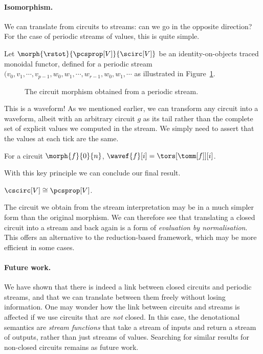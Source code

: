 \documentclass[11pt,numbib]{article}
\begin{document}
\paragraph*{Isomorphism.}

We can translate from circuits to streams: can we go in the opposite direction?
For the case of periodic streams of values, this is quite simple.

\begin{definition}
    Let $\morph{\rstot}{\pcsprop[V]}{\scirc[V]}$ be an identity-on-objects traced monoidal functor, defined for a periodic stream $(v_0,v_1,\cdots,v_{p-1},w_0,w_1,\cdots,w_{r-1},w_0,w_1,\cdots$ as illustrated in Figure~\ref{fig:streamcirc}.
\end{definition}

\begin{figure}
    \centering
    \caption{The circuit morphism obtained from a periodic stream.}
    \label{fig:streamcirc}
\end{figure}

\noindent
This is a waveform!
As we mentioned earlier, we can transform any circuit into a waveform, albeit with an arbitrary circuit $g$ as its tail rather than the complete set of explicit values we computed in the stream.
We simply need to assert that the values at each tick are the same.

\begin{proposition}
    For a circuit $\morph{f}{0}{n}$, $\wavef{f}[i] = \tors[\tomm[f]][i]$.
\end{proposition}

\noindent
With this key principle we can conclude our final result.

\begin{theorem}
    $\cscirc[V] \cong \pcsprop[V]$.
\end{theorem}

\noindent
The circuit we obtain from the stream interpretation may be in a much simpler form than the original morphism.
We can therefore see that translating a closed circuit into a stream and back again is a form of \emph{evaluation by normalisation}.
This offers an alternative to the reduction-based framework, which may be more efficient in some cases.

\paragraph*{Future work.}

We have shown that there is indeed a link between closed circuits and periodic streams, and that we can translate between them freely without losing information.
One may wonder how the link between circuits and streams is affected if we use circuits that are \emph{not} closed.
In this case, the denotational semantics are \emph{stream functions} that take a stream of inputs and return a stream of outputs, rather than just streams of values.
Searching for similar results for non-closed circuits remains as future work.

\printbibliography[heading=bibintoc,title={References}]
\end{document}

